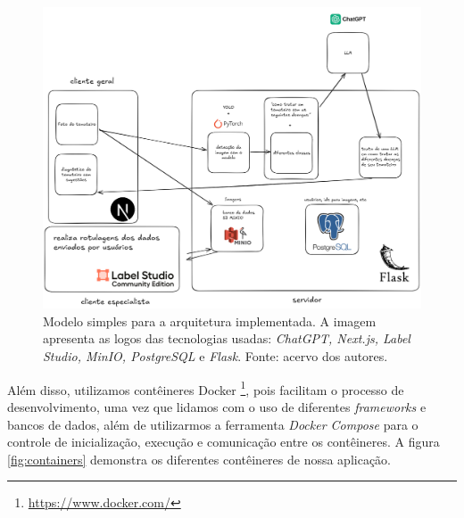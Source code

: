 \begin{figure}[htbp]
    \centering
    \includegraphics[width=1\linewidth]{images/modelo.png}
    \caption{\label{fig:modelo_arq} Modelo simples para a arquitetura implementada. A imagem apresenta as logos das tecnologias usadas: \emph{ChatGPT, Next.js, Label Studio, MinIO, PostgreSQL} e \emph{Flask}. Fonte: acervo dos autores.}
\end{figure}

Além disso, utilizamos contêineres Docker \footnote{\url{https://www.docker.com/}}, pois facilitam o processo de desenvolvimento, uma vez que lidamos com o uso de diferentes \textit{frameworks} e bancos de dados, além de utilizarmos a ferramenta \emph{Docker Compose} para o controle de inicialização, execução e comunicação entre os contêineres. A figura \ref{fig:containers} demonstra os diferentes contêineres de nossa aplicação.

